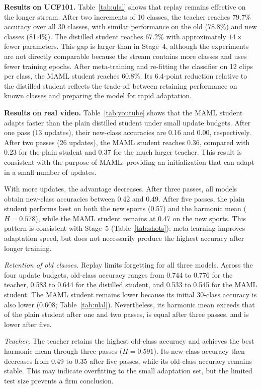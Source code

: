 \documentclass[conference]{IEEEtran}
\begin{document}
\textbf{Results on UCF101.} Table~\ref{tab:ulal} shows that replay remains effective on
the longer stream. After two increments of 10 classes, the teacher reaches 79.7\% accuracy
over all 30 classes, with similar performance on the old (78.8\%) and new classes (81.4\%).
The distilled student reaches 67.2\% with approximately $14\times$ fewer parameters. This
gap is larger than in Stage~4, although the experiments are not directly comparable because
the stream contains more classes and uses fewer training epochs. After meta-training and
re-fitting the classifier on 12 clips per class, the MAML student reaches 60.8\%. Its
6.4-point reduction relative to the distilled student reflects the trade-off between
retaining performance on known classes and preparing the model for rapid adaptation.

\textbf{Results on real video.} Table~\ref{tab:youtube} shows that the MAML student adapts
faster than the plain distilled student under small update budgets. After one pass (13
updates), their new-class accuracies are 0.16 and 0.00, respectively. After two passes (26
updates), the MAML student reaches 0.36, compared with 0.23 for the plain student and 0.37
for the much larger teacher. This result is consistent with the purpose of MAML: providing
an initialization that can adapt in a small number of updates.

With more updates, the advantage decreases. After three passes, all models obtain
new-class accuracies between 0.42 and 0.49. After five passes, the plain student performs
best on both the new sports (0.57) and the harmonic mean ($H=0.578$), while the MAML student
remains at 0.47 on the new sports. This pattern is consistent with Stage~5
(Table~\ref{tab:shots}): meta-learning improves adaptation speed, but does not necessarily
produce the highest accuracy after longer training.

\emph{Retention of old classes.} Replay limits forgetting for all three models. Across
the four update budgets, old-class accuracy ranges from 0.744 to 0.776 for the teacher,
0.583 to 0.644 for the distilled student, and 0.533 to 0.545 for the MAML student. The MAML
student remains lower because its initial 30-class accuracy is also lower (0.608;
Table~\ref{tab:ulal}). Nevertheless, its harmonic mean exceeds that of the plain student
after one and two passes, is equal after three passes, and is lower after five.

\emph{Teacher.} The teacher retains the highest old-class accuracy and achieves the best
harmonic mean through three passes ($H=0.591$). Its new-class accuracy then decreases from
0.49 to 0.35 after five passes, while its old-class accuracy remains stable. This may
indicate overfitting to the small adaptation set, but the limited test size prevents a
firm conclusion.
\end{document}

